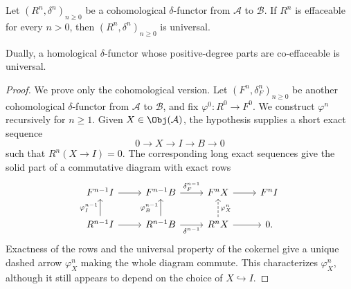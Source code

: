 \begin{proposition}\label{prop:erasable-univ-delta}
	Let $(R^n,\delta^n)_{n\geq0}$ be a cohomological $\delta$-functor from
	$\mathcal{A}$ to $\mathcal{B}$. If $R^n$ is effaceable for every $n>0$,
	then $(R^n,\delta^n)_{n\geq0}$ is universal.

	Dually, a homological $\delta$-functor whose positive-degree parts are
	co-effaceable is universal.
\end{proposition}
\begin{proof}
	We prove only the cohomological version. Let
	$(F^n,\delta_F^n)_{n\geq0}$ be another cohomological $\delta$-functor from
	$\mathcal{A}$ to $\mathcal{B}$, and fix $\varphi^0:R^0\to F^0$. We
	construct $\varphi^n$ recursively for $n\geq1$. Given
	$X\in\Obj(\mathcal{A})$, the hypothesis supplies a short exact sequence
	\[ 0 \to X \to I \to B \to 0 \]
	such that $R^n(X\to I)=0$. The corresponding long exact sequences give
	the solid part of a commutative diagram with exact rows
	\[\begin{tikzcd}
		F^{n-1} I \arrow[r] & F^{n-1} B \arrow[r, "{\delta_F^{n-1}}"] & F^n X \arrow[r] & F^n I \\
		R^{n-1} I \arrow[u, "{\varphi^{n-1}_I}"] \arrow[r] & R^{n-1} B \arrow[u, "{\varphi^{n-1}_B}"] \arrow[r, "{\delta^{n-1}}"'] & R^n X \arrow[dashed, u, "{\varphi^n_X}"'] \arrow[r] & 0 .
	\end{tikzcd}\]
	Exactness of the rows and the universal property of the cokernel give a
	unique dashed arrow $\varphi_X^n$ making the whole diagram commute. This
	characterizes $\varphi_X^n$, although it still appears to depend on the
	choice of $X\hookrightarrow I$.


\end{proof}
